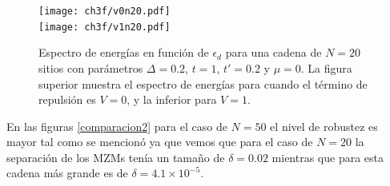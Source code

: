 %

%
\begin{figure}[H]
\begin{center}
\texttt{[image: ch3f/v0n20.pdf]}\\
\vspace{-0.3cm}
\texttt{[image: ch3f/v1n20.pdf]}
\end{center}
\caption{Espectro de energ\'{i}as en funci\'{o}n de $\epsilon_d$ para una cadena de $N=20$ sitios con par\'{a}metros $\Delta=0.2$, $t=1$, $t'=0.2$ y $\mu=0$. La figura superior muestra el espectro de energ\'{i}as para cuando el t\'{e}rmino de repulsi\'{o}n es $V=0$, y la inferior para $V=1$.}
\label{comparacion1}
\end{figure} En las figuras \ref{comparacion2} para el caso de $N=50$ el nivel de robustez es mayor tal como se mencion\'{o} ya que vemos que para el caso de $N=20$ la separaci\'{o}n de los MZMs ten\'{i}a un tama\~{n}o de $\delta=0.02$ mientras que para esta cadena m\'{a}s grande es de $\delta=4.1\times 10^{-5}$.

